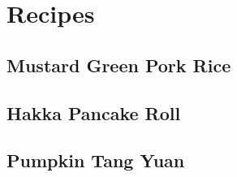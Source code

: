 \chapter{Recipes}
\label{append:recipes}
\vspace*{2em}

\lipsum[1]

\section{Mustard Green Pork Rice}
\label{appsec:prok_rice}

\lipsum[2-3]

\section{Hakka Pancake Roll}
\label{appsec:pancake_roll}

\lipsum[4-6]

\section{Pumpkin Tang Yuan}
\label{appsec:tang_yuan}

\lipsum[7-8]
